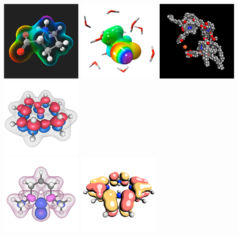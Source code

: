 \documentclass[a4paper,12pt]{article}
\begin{document}
\begin{center}
\includegraphics[scale=0.58]{figures/gallery/g5_sm.png}\
\includegraphics[scale=0.58]{figures/gallery/g3_sm.png}\
\includegraphics[scale=0.58]{figures/gallery/g20_sm.png}\
\includegraphics[scale=0.58]{figures/gallery/g6_sm.png} \\
\includegraphics[scale=0.58]{figures/gallery/g2_sm.png}\
\includegraphics[scale=0.58]{figures/gallery/g9_sm.png}\

\end{center}
\end{document}
